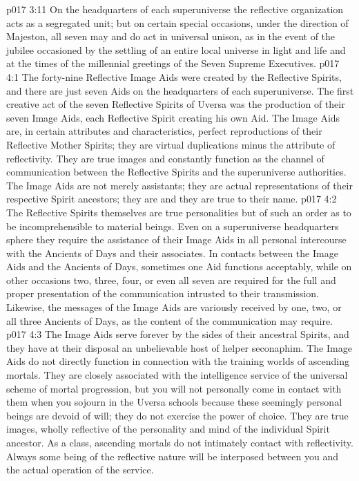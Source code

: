 \vs p017 3:11 On the headquarters of each superuniverse the reflective organization acts as a segregated unit; but on certain special occasions, under the direction of Majeston, all seven may and do act in universal unison, as in the event of the jubilee occasioned by the settling of an entire local universe in light and life and at the times of the millennial greetings of the Seven Supreme Executives.
\vs p017 4:1 The forty\hyp{}nine Reflective Image Aids were created by the Reflective Spirits, and there are just seven Aids on the headquarters of each superuniverse. The first creative act of the seven Reflective Spirits of Uversa was the production of their seven Image Aids, each Reflective Spirit creating his own Aid. The Image Aids are, in certain attributes and characteristics, perfect reproductions of their Reflective Mother Spirits; they are virtual duplications minus the attribute of reflectivity. They are true images and constantly function as the channel of communication between the Reflective Spirits and the superuniverse authorities. The Image Aids are not merely assistants; they are actual representations of their respective Spirit ancestors; they are  and they are true to their name.
\vs p017 4:2 The Reflective Spirits themselves are true personalities but of such an order as to be incomprehensible to material beings. Even on a superuniverse headquarters sphere they require the assistance of their Image Aids in all personal intercourse with the Ancients of Days and their associates. In contacts between the Image Aids and the Ancients of Days, sometimes one Aid functions acceptably, while on other occasions two, three, four, or even all seven are required for the full and proper presentation of the communication intrusted to their transmission. Likewise, the messages of the Image Aids are variously received by one, two, or all three Ancients of Days, as the content of the communication may require.
\vs p017 4:3 The Image Aids serve forever by the sides of their ancestral Spirits, and they have at their disposal an unbelievable host of helper seconaphim. The Image Aids do not directly function in connection with the training worlds of ascending mortals. They are closely associated with the intelligence service of the universal scheme of mortal progression, but you will not personally come in contact with them when you sojourn in the Uversa schools because these seemingly personal beings are devoid of will; they do not exercise the power of choice. They are true images, wholly reflective of the personality and mind of the individual Spirit ancestor. As a class, ascending mortals do not intimately contact with reflectivity. Always some being of the reflective nature will be interposed between you and the actual operation of the service.
